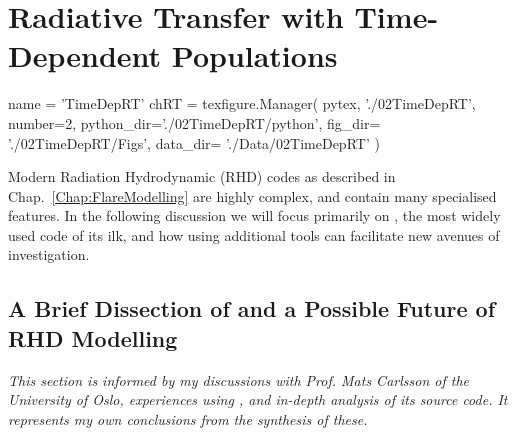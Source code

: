 \chapter{Radiative Transfer with Time-Dependent Populations}\label{Chap:TimeDepRt}
\begin{pycode}[TimeDepRT]
name = 'TimeDepRT'
chRT = texfigure.Manager(
    pytex,
    './02TimeDepRT',
    number=2,
    python_dir='./02TimeDepRT/python',
    fig_dir=   './02TimeDepRT/Figs',
    data_dir=  './Data/02TimeDepRT'
)
\end{pycode}



Modern Radiation Hydrodynamic (RHD) codes as described in Chap.~\ref{Chap:FlareModelling} are highly complex, and contain many specialised features.
In the following discussion we will focus primarily on \Radyn{}, the most widely used code of its ilk, and how using additional tools can facilitate new avenues of investigation.

\section{A Brief Dissection of \Radyn{} and a Possible Future of RHD Modelling}\label{Sec:RadynDissection}

\emph{This section is informed by my discussions with Prof. Mats Carlsson of the University of Oslo, experiences using \Radyn{}, and in-depth analysis of its source code. It represents my own conclusions from the synthesis of these.}

